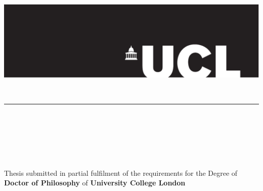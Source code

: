 %

\begin{titlepage}
	\tgherosfont
	\vglue -4.0cm
    \hspace{-4.1cm}
    \includegraphics[scale=1]{gfx/ucllogo.pdf}
    \begin{center}
    {\LARGE \thesisUniversity} \\[2mm]
    \rule{9cm}{.4pt}\\
    \medskip 
    \textsf{\thesisUniversityInstitute} \\
    \textsf{\thesisUniversityDepartment} \\
     \bigskip\bigskip
 	{\huge \color{ctcolortitle}\textbf{\thesisTitle} \\[8mm]}
    \vspace{1.0mm} 
    \medskip
 	{\LARGE \thesisName} \\[15mm]
    {%
    \begin{large}
    \begin{minipage}[b]{12cm}
     \centering \small{Thesis submitted in partial fulfilment of the requirements for the Degree of \\ \textbf{Doctor of Philosophy} of \textbf{University College London}}
    \end{minipage}
    \end{large}}
    \vspace{4.2mm} \\
     

\end{center}
\end{titlepage}
